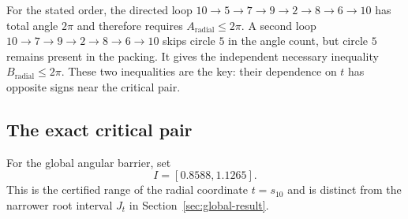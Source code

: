 \documentclass[11pt,a4paper]{article}
\theoremstyle{remark}
\begin{document}
For the stated order, the directed loop
$10\to5\to7\to9\to2\to8\to6\to10$ has total angle $2\pi$ and therefore
requires $A_{\mathrm{radial}}\le2\pi$.  A second loop
$10\to7\to9\to2\to8\to6\to10$ skips circle $5$ in the angle count, but
circle $5$ remains present in the packing.  It gives the independent
necessary inequality $B_{\mathrm{radial}}\le2\pi$.  These two inequalities
are the key: their dependence on $t$ has opposite signs near the critical
pair.

\subsection{The exact critical pair}

For the global angular barrier, set
\[
  I=[0.8588,1.1265].
\]
This is the certified range of the radial coordinate $t=s_{10}$ and is
distinct from the narrower root interval $J_t$ in
Section~\ref{sec:global-result}.
\end{document}
